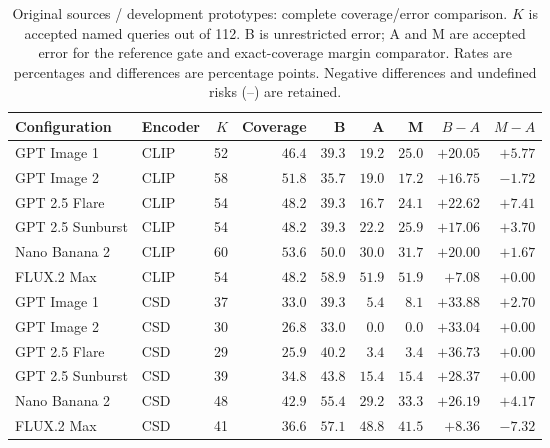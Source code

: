 \begin{table}[!htbp]
\caption{Original sources / development prototypes: complete coverage/error comparison. $K$ is accepted named queries out of 112. B is unrestricted error; A and M are accepted error for the reference gate and exact-coverage margin comparator. Rates are percentages and differences are percentage points. Negative differences and undefined risks (--) are retained.}
\label{tab:selective-risks-original-development}
\centering\footnotesize\setlength{\tabcolsep}{3pt}
\begin{tabularx}{\linewidth}{@{}Xlrrrrrrr@{}}\toprule
Configuration & Encoder & $K$ & Coverage & B & A & M & $B-A$ & $M-A$\\\midrule
GPT Image 1 & CLIP & 52 & $46.4$ & $39.3$ & $19.2$ & $25.0$ & $+20.05$ & $+5.77$\\
GPT Image 2 & CLIP & 58 & $51.8$ & $35.7$ & $19.0$ & $17.2$ & $+16.75$ & $-1.72$\\
GPT 2.5 Flare & CLIP & 54 & $48.2$ & $39.3$ & $16.7$ & $24.1$ & $+22.62$ & $+7.41$\\
GPT 2.5 Sunburst & CLIP & 54 & $48.2$ & $39.3$ & $22.2$ & $25.9$ & $+17.06$ & $+3.70$\\
Nano Banana 2 & CLIP & 60 & $53.6$ & $50.0$ & $30.0$ & $31.7$ & $+20.00$ & $+1.67$\\
FLUX.2 Max & CLIP & 54 & $48.2$ & $58.9$ & $51.9$ & $51.9$ & $+7.08$ & $+0.00$\\
GPT Image 1 & CSD & 37 & $33.0$ & $39.3$ & $5.4$ & $8.1$ & $+33.88$ & $+2.70$\\
GPT Image 2 & CSD & 30 & $26.8$ & $33.0$ & $0.0$ & $0.0$ & $+33.04$ & $+0.00$\\
GPT 2.5 Flare & CSD & 29 & $25.9$ & $40.2$ & $3.4$ & $3.4$ & $+36.73$ & $+0.00$\\
GPT 2.5 Sunburst & CSD & 39 & $34.8$ & $43.8$ & $15.4$ & $15.4$ & $+28.37$ & $+0.00$\\
Nano Banana 2 & CSD & 48 & $42.9$ & $55.4$ & $29.2$ & $33.3$ & $+26.19$ & $+4.17$\\
FLUX.2 Max & CSD & 41 & $36.6$ & $57.1$ & $48.8$ & $41.5$ & $+8.36$ & $-7.32$\\
\bottomrule\end{tabularx}
\end{table}
